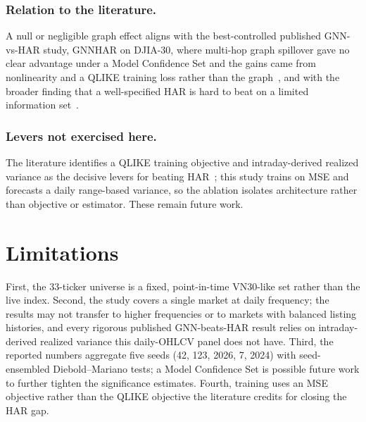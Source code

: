 \documentclass[runningheads]{llncs}
\begin{document}
\subsubsection{Relation to the literature.}
A null or negligible graph effect aligns with the best-controlled published GNN-vs-HAR study, GNNHAR on
DJIA-30, where multi-hop graph spillover gave no clear advantage under a Model Confidence Set and the gains
came from nonlinearity and a QLIKE training loss rather than the graph~\cite{zhang2025gnnhar}, and with the
broader finding that a well-specified HAR is hard to beat on a limited information set~\cite{audrino2025}.

\subsubsection{Levers not exercised here.}
The literature identifies a QLIKE training objective and intraday-derived realized variance as the decisive
levers for beating HAR~\cite{zhang2025gnnhar}; this study trains on MSE and forecasts a daily range-based
variance, so the ablation isolates architecture rather than objective or estimator. These remain future
work.

\section{Limitations}
\label{sec:limitations}
First, the 33-ticker universe is a fixed, point-in-time VN30-like set rather than the live index. Second,
the study covers a single market at daily frequency; the results may not transfer to higher frequencies or
to markets with balanced listing histories, and every rigorous published GNN-beats-HAR result relies on
intraday-derived realized variance this daily-OHLCV panel does not have. Third, the reported numbers
aggregate five seeds (42, 123, 2026, 7, 2024) with seed-ensembled Diebold--Mariano tests; a Model
Confidence Set is possible future work to further tighten the significance estimates. Fourth, training uses
an MSE objective rather than the QLIKE objective the literature credits for closing the HAR gap.

\end{document}
